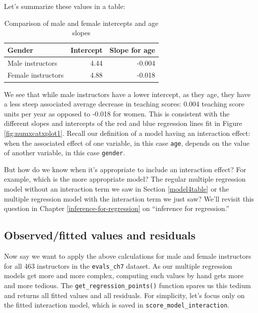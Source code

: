 \documentclass[12pt, krantz2,]{krantz}
\begin{document}
Let's summarize these values in a table:

\begin{table}[H]

\caption{\label{tab:unnamed-chunk-223}Comparison of male and female intercepts and age slopes}
\centering
\fontsize{10}{12}\selectfont
\begin{tabular}{lrr}
\toprule
Gender & Intercept & Slope for age\\
\midrule
Male instructors & 4.44 & -0.004\\
Female instructors & 4.88 & -0.018\\
\bottomrule
\end{tabular}
\end{table}

We see that while male instructors have a lower intercept, as they age, they have a less steep associated average decrease in teaching scores: 0.004 teaching score units per year as opposed to -0.018 for women. This is consistent with the different slopes and intercepts of the red and blue regression lines fit in Figure \ref{fig:numxcatxplot1}. Recall our definition of a model having an interaction effect: when the associated effect of one variable, in this case \texttt{age}, depends on the value of another variable, in this case \texttt{gender}.

But how do we know when it's appropriate to include an interaction effect? For example, which is the more appropriate model? The regular multiple regression model without an interaction term we saw in Section \ref{model4table} or the multiple regression model with the interaction term we just saw? We'll revisit this question in Chapter \ref{inference-for-regression} on ``inference for regression.''

\hypertarget{model4points}{%
\subsection{Observed/fitted values and residuals}\label{model4points}}

Now say we want to apply the above calculations for male and female instructors for all 463 instructors in the \texttt{evals\_ch7} dataset. As our multiple regression models get more and more complex, computing such values by hand gets more and more tedious. The \texttt{get\_regression\_points()} function spares us this tedium and returns all fitted values and all residuals. For simplicity, let's focus only on the fitted interaction model, which is saved in \texttt{score\_model\_interaction}.
\end{document}
